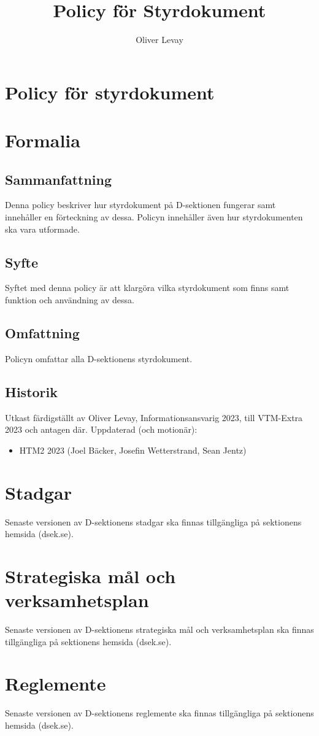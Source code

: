 \documentclass[]{dsekprotokoll}
\title{Policy för Styrdokument}
\author{Oliver Levay}
\begin{document}
\section*{Policy för styrdokument}
\section{Formalia}
\subsection{Sammanfattning}
Denna policy beskriver hur styrdokument på D-sektionen fungerar samt innehåller en förteckning av dessa. Policyn innehåller även hur styrdokumenten ska vara utformade.
\subsection{Syfte}
Syftet med denna policy är att klargöra vilka styrdokument som finns samt funktion och användning av dessa.
\subsection{Omfattning}
Policyn omfattar alla D-sektionens styrdokument.

\subsection{Historik}
Utkast färdigställt av Oliver Levay, Informationsansvarig 2023, till VTM-Extra 2023 och antagen där.
Uppdaterad (och motionär):
\begin{itemize}
\item HTM2 2023 (Joel Bäcker, Josefin Wetterstrand, Sean Jentz)
\end{itemize}
\section{Stadgar}
Senaste versionen av D-sektionens stadgar ska finnas tillgängliga på sektionens hemsida (dsek.se).

\section{Strategiska mål och verksamhetsplan}
Senaste versionen av D-sektionens strategiska mål och verksamhetsplan ska finnas tillgängliga på sektionens hemsida (dsek.se).

\section{Reglemente}
Senaste versionen av D-sektionens reglemente ska finnas tillgängliga på sektionens hemsida (dsek.se).
\end{document}

